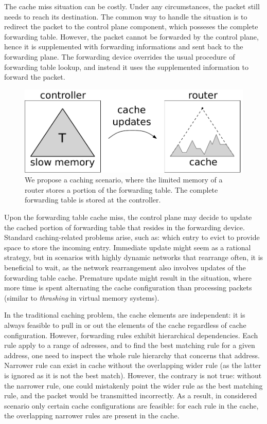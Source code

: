 The cache miss situation can be costly.
Under any circumstances, the packet still needs to reach its destination.
The common way to handle the situation is to redirect the packet to the control plane component, which posseses the complete forwarding table.
However, the packet cannot be forwarded by the control plane, hence it is supplemented with forwarding informations and sent back to the forwarding plane.
The forwarding device overrides the usual procedure of forwarding table lookup, and instead it uses the supplemented information to forward the packet.


\begin{figure}[h]
\centering
\includegraphics[width=0.39\columnwidth]{figs/router2.pdf}
\caption{We propose a caching scenario, where the limited memory of a router stores a portion of the forwarding table. The complete forwarding table is stored at the controller.}\label{fig:router}
\vspace{-1em}
\end{figure}




Upon the forwarding table cache miss, the control plane may decide to update the cached portion of forwarding table that resides in the forwarding device.
Standard caching-related problems arise, such as: which entry to evict to provide space to store the incoming entry.
Immediate update might seem as a rational strategy, but in scenarios with highly dynamic networks that rearrange often, it is beneficial to wait, as the network rearrangement also involves updates of the forwarding table cache.
Premature update might result in the situation, where more time is spent alternating the cache configuration than processing packets (similar to \emph{thrashing} in virtual memory systems).

In the traditional caching problem, the cache elements are independent: it is always feasible to pull in or out the elements of the cache regardless of cache configuration.
However, forwarding rules exhibit hierarchical dependencies.
Each rule apply to a range of adresses, and to find the best matching rule for a given address, one need to inspect the whole rule hierarchy that concerns that address.
Narrower rule can exist in cache without the overlapping wider rule (as the latter is ignored as it is not the best match).
However, the contrary is not true: without the narrower rule, one could mistakenly point the wider rule as the best matching rule, and the packet would be transmitted incorrectly.
As a result, in considered scenario only certain cache configurations are feasible: for each rule in the cache, the overlapping narrower rules are present in the cache.


